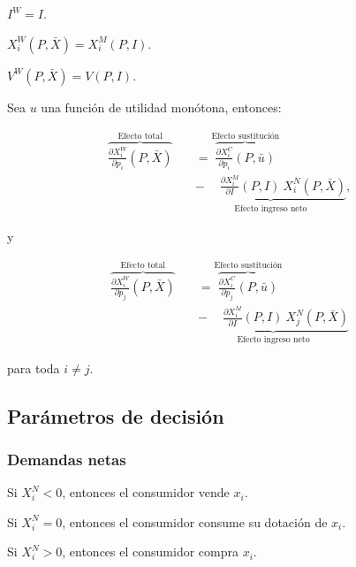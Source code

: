 \documentclass[8pt,a4paper]{extarticle}
\begin{document}
\begin{multicols}{3}
\begin{eqlist}
\item $ \displaystyle I^W = I$.
\item $X^W_i (P, \bar{X}) = X^M_i (P, I)$.
\item $V^W(P, \bar{X}) = V(P, I)$.
\end{eqlist}

\begin{boxtheo}
	Sea $u$ una función de utilidad monótona, entonces:
	
	\begin{equation*}
	\begin{aligned}
		\overbrace{\frac{\partial X^W_i}{\partial p_i} (P, \bar{X})}^{\text{Efecto total}} \quad &= \overbrace{\frac{\partial X^C_i}{\partial p_i} (P, \bar{u})}^{\text{Efecto sustitución}} \\
																						   & \underbrace{ - \quad\ \frac{\partial X_i^M}{\partial I} (P, I)\ X^N_i (P,\bar{X})}_{\text{Efecto ingreso neto}},
	\end{aligned}
	\end{equation*}
	
	y
	
	\begin{equation*}
	\begin{aligned}
		\overbrace{\frac{\partial X^W_i}{\partial p_j} (P, \bar{X})}^{\text{Efecto total}} \quad &= \overbrace{\frac{\partial X^C_i}{\partial p_j} (P, \bar{u})}^{\text{Efecto sustitución}} \\
																						   & \underbrace{ - \quad\ \frac{\partial X_i^M}{\partial I} (P, I)\ X^N_j (P,\bar{X})}_{\text{Efecto ingreso neto}}
	\end{aligned}
	\end{equation*} 

	para toda $i \neq j$.
\end{boxtheo}

\subsection{Parámetros de decisión}

\subsubsection*{Demandas netas}

\begin{eqlist}
\item Si $X_i^N < 0$, entonces el consumidor vende $x_i$.
\item Si $X_i^N = 0$, entonces el consumidor consume su dotación de $x_i$.
\item Si $X_i^N > 0$, entonces el consumidor compra $x_i$.
\end{eqlist}


\end{multicols}
\end{document}
